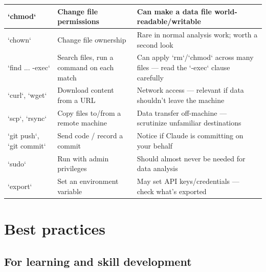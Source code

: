 \documentclass[
]{book}
\begin{document}
\begin{table}
\begin{tabular}[t]{>{\raggedright\arraybackslash}p{5em}|>{\raggedright\arraybackslash}p{11em}|>{\raggedright\arraybackslash}p{12em}}
\hline
\hspace{1em}`chmod` & Change file permissions & Can make a data file world-readable/writable\\
\hline
\hspace{1em}`chown` & Change file ownership & Rare in normal analysis work; worth a second look\\
\hline
\hspace{1em}`find ... -exec` & Search files, run a command on each match & Can apply `rm`/`chmod` across many files — read the `-exec` clause carefully\\
\hline
\hspace{1em}`curl`, `wget` & Download content from a URL & Network access — relevant if data shouldn't leave the machine\\
\hline
\hspace{1em}`scp`, `rsync` & Copy files to/from a remote machine & Data transfer off-machine — scrutinize unfamiliar destinations\\
\hline
\hspace{1em}`git push`, `git commit` & Send code / record a commit & Notice if Claude is committing on your behalf\\
\hline
\hspace{1em}`sudo` & Run with admin privileges & Should almost never be needed for data analysis\\
\hline
\hspace{1em}`export` & Set an environment variable & May set API keys/credentials — check what's exported\\
\hline
\end{tabular}
\endgroup{}
\end{table}

\section{Best practices}\label{best-practices}

\subsection{For learning and skill development}\label{for-learning-and-skill-development}
\end{document}
